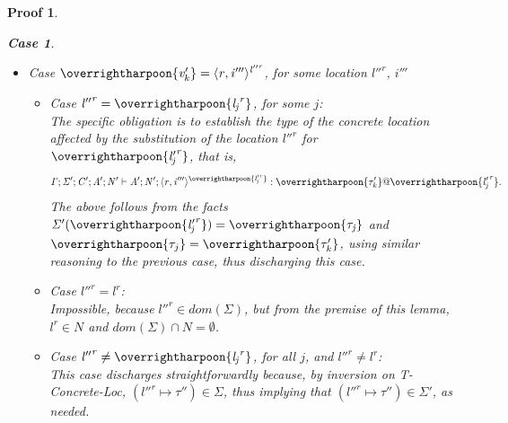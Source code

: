 \documentclass[showabstract,showacknowledgments,showpreface,showdedication,school]{iuphd}
\newtheorem*{bcase}{Case}
\theoremstyle{nonumberplain}
\newtheorem{nproof}{Proof}
\newcommand{\keywd}[1]{\mathit{#1}}
\newcommand{\skeywd}[1]{\mathit{#1}}
\newcommand{\TYP}{\keywd{\tau}}
\newcommand{\loc}{\skeywd{l}}
\newcommand{\concreteloc}[3]{\ensuremath{\langle #1, #2 \rangle ^{#3}}}
\newcommand{\reg}{\skeywd{r}}
\newcommand{\ind}{\keywd{i}}
\newcommand{\indj}{\keywd{j}}
\newcommand{\VAL}{\keywd{v}}
\newcommand{\CENV}{\keywd{C}}
\newcommand{\TENV}{\keywd{\Gamma}}
\newcommand{\SENV}{\keywd{\Sigma}}
\newcommand{\AENV}{\keywd{A}}
\newcommand{\NENV}{\keywd{N}}
\newcommand{\locreg}[2]{\ensuremath{{#1}^{#2}}}
\newcommand{\tvar}{T-Var}
\newcommand{\tconcreteloc}{T-Concrete-Loc}
\newcommand{\overharpoon}[1]{\overrightharpoon{#1}}
\begin{document}
\begin{nproof}
\begin{bcase}
\begin{itemize}
\begin{itemize}
        This case discharges immediately by implication of the typing judgement of the
        source term given in the premise of this lemma, and by inversion on \tvar{}.
      \end{itemize}
    \item Case $\overharpoon{\VAL'_k} = \concreteloc{\reg}{\ind'''}{\locreg{\loc''}{\reg}}$,
      for some location $\locreg{\loc''}{\reg}$, $\ind'''$\\
      \begin{itemize}
      \item Case $\locreg{\loc''}{\reg} = \overharpoon{\locreg{\loc_{\indj}}{\reg}}$, for some
        $\indj$:\\
        The specific obligation is to establish the type of
        the concrete location affected by the substitution of the location $\locreg{\loc''}{\reg}$
        for $\overharpoon{\locreg{\loc'_{\indj}}{\reg}}$, that is,
        \begin{displaymath}
        \TENV; \SENV'; \CENV'; \AENV'; \NENV' \vdash \AENV'; \NENV'; \concreteloc{\reg}{\ind'''}{\overharpoon{\locreg{\loc'_{\indj}}{\reg}}} : \overharpoon{\TYP'_k} \ensuremath{@} \overharpoon{\locreg{\loc'_j}{\reg}}.
        \end{displaymath}
        The above follows from the facts $\SENV'(\overharpoon{\locreg{\loc'_{\indj}}{\reg}}) = \overharpoon{\TYP_{\indj}}$
        and $\overharpoon{\TYP_j} = \overharpoon{\TYP'_k}$, using
        similar reasoning to the previous case, thus discharging this case.
      \item Case $\locreg{\loc''}{\reg} = \locreg{\loc}{\reg}$:\\
      Impossible, because $\locreg{\loc''}{\reg} \in dom(\SENV)$, but from the premise of this lemma,
      $\locreg{\loc}{\reg} \in \NENV$ and $dom(\SENV) \cap \NENV = \emptyset$.
      \item Case $\locreg{\loc''}{\reg} \neq \overharpoon{\locreg{\loc_{\indj}}{\reg}}$, for all
        $\indj$, and $\locreg{\loc''}{\reg} \neq \locreg{\loc}{\reg}$:\\
        This case discharges straightforwardly because, by inversion on \tconcreteloc{},
        $(\locreg{\loc''}{\reg} \mapsto \TYP'') \in \SENV$, thus implying that
        $(\locreg{\loc''}{\reg} \mapsto \TYP'') \in \SENV'$,
        as needed.
      \end{itemize}
    \end{itemize}
  \end{bcase}


\end{nproof}
\end{document}

